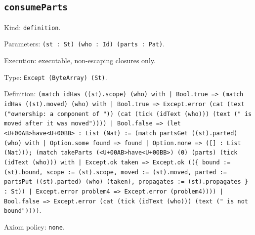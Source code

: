 \documentclass[11pt]{article}
\begin{document}
\subsection*{\texttt{consumeParts}}
\noindent Kind: \texttt{definition}.\par
\noindent Parameters: \texttt{(st : St) (who : Id) (parts : Pat)}.\par
\noindent Execution: executable, non-escaping closures only.\par
\noindent Type: \texttt{Except (ByteArray) (St)}.\par
\noindent Definition: \texttt{(match idHas ((st).scope) (who) with | Bool.true => (match idHas ((st).moved) (who) with | Bool.true => Except.error (cat (text ("ownership: a component of ")) (cat (tick (idText (who))) (text (" is moved after it was moved")))) | Bool.false => (let <U+00AB>have<U+00BB> : List (Nat) := (match partsGet ((st).parted) (who) with | Option.some found => found | Option.none => ([] : List (Nat))); (match takeParts (<U+00AB>have<U+00BB>) (0) (parts) (tick (idText (who))) with | Except.ok taken => Except.ok ((\{ bound := (st).bound, scope := (st).scope, moved := (st).moved, parted := partsPut ((st).parted) (who) (taken), propagates := (st).propagates \} : St)) | Except.error problem4 => Except.error (problem4)))) | Bool.false => Except.error (cat (tick (idText (who))) (text (" is not bound"))))}.\par
\noindent Axiom policy: \texttt{none}.\par
\end{document}
